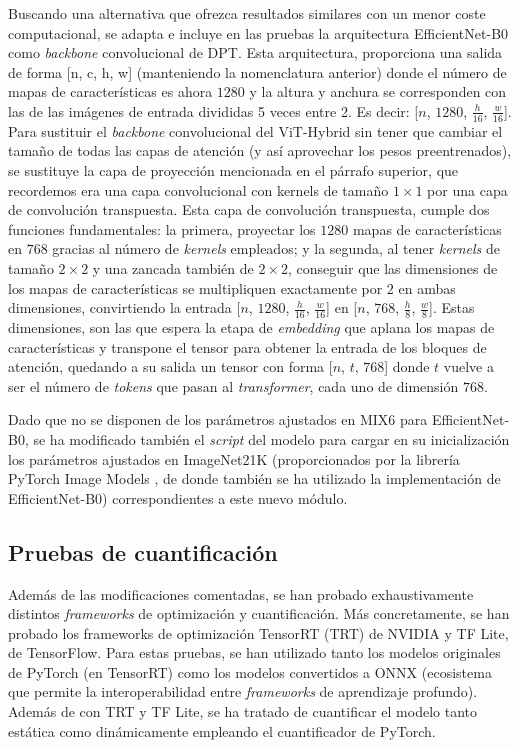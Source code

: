 Buscando una alternativa que ofrezca resultados similares con un menor coste computacional, se adapta e incluye en las pruebas la arquitectura EfficientNet-B0 como \textit{backbone} convolucional de DPT. Esta arquitectura, proporciona una salida de forma [n, c, h, w] (manteniendo la nomenclatura anterior) donde el número de mapas de características es ahora $1280$ y la altura y anchura se corresponden con las de las imágenes de entrada divididas 5 veces entre 2. Es decir: [$n$, $1280$, $\frac{h}{16}$, $\frac{w}{16}$]. Para sustituir el \textit{backbone} convolucional del ViT-Hybrid sin tener que cambiar el tamaño de todas las capas de atención (y así aprovechar los pesos preentrenados), se sustituye la capa de proyección mencionada en el párrafo superior, que recordemos era una capa convolucional con kernels de tamaño $1\times1$ por una capa de convolución transpuesta. Esta capa de convolución transpuesta, cumple dos funciones fundamentales: la primera, proyectar los $1280$ mapas de características en $768$ gracias al número de \textit{kernels} empleados; y la segunda, al tener \textit{kernels} de tamaño $2\times2$ y una zancada también de $2\times2$, conseguir que las dimensiones de los mapas de características se multipliquen exactamente por $2$ en ambas dimensiones, convirtiendo la entrada [$n$, $1280$, $\frac{h}{16}$, $\frac{w}{16}$] en [$n$, $768$, $\frac{h}{8}$, $\frac{w}{8}$]. Estas dimensiones, son las que espera la etapa de \textit{embedding} que aplana los mapas de características y transpone el tensor para obtener la entrada de los bloques de atención, quedando a su salida un tensor con forma [$n$, $t$, $768$] donde $t$ vuelve a ser el número de \textit{tokens} que pasan al \textit{transformer}, cada uno de dimensión $768$.

Dado que no se disponen de los parámetros ajustados en MIX6 para EfficientNet-B0, se ha modificado también el \textit{script} del modelo para cargar en su inicialización los parámetros ajustados en ImageNet21K (proporcionados por la librería PyTorch Image Models \cite{timm}, de donde también se ha utilizado la implementación de EfficientNet-B0) correspondientes a este nuevo módulo. 

\subsection{Pruebas de cuantificación}
Además de las modificaciones comentadas, se han probado exhaustivamente distintos \textit{frameworks} de optimización y cuantificación. Más concretamente, se han probado los frameworks de optimización TensorRT (TRT) de NVIDIA y TF Lite, de TensorFlow. Para estas pruebas, se han utilizado tanto los modelos originales de PyTorch (en TensorRT) como los modelos convertidos a ONNX (ecosistema que permite la interoperabilidad entre \textit{frameworks} de aprendizaje profundo). Además de con TRT y TF Lite, se ha tratado de cuantificar el modelo tanto estática como dinámicamente empleando el cuantificador de PyTorch.


